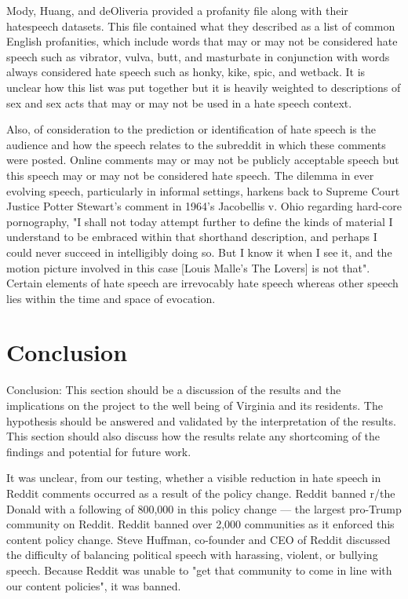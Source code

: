 \documentclass[conference]{IEEEtran}
\begin{document}
Mody, Huang, and deOliveria\cite{b8} provided a profanity file along with their hatespeech\cite{b8} datasets. This file contained what they described as a list of common English profanities, which include words that may or may not be considered hate speech such as vibrator, vulva, butt, and masturbate in conjunction with words always considered hate speech such as honky, kike, spic, and wetback. It is unclear how this list was put together but it is heavily weighted to descriptions of sex and sex acts that may or may not be used in a hate speech context. 

Also, of consideration to the prediction or identification of hate speech is the audience and how the speech relates to the subreddit in which these comments were posted. Online comments may or may not be publicly acceptable speech but this speech may or may not be considered hate speech. The dilemma in ever evolving speech, particularly in informal settings, harkens back to Supreme Court Justice Potter Stewart's comment in 1964's Jacobellis v. Ohio regarding hard-core pornography, "I shall not today attempt further to define the kinds of material I understand to be embraced within that shorthand description, and perhaps I could never succeed in intelligibly doing so. But I know it when I see it, and the motion picture involved in this case [Louis Malle's The Lovers] is not that"\cite{b24}. Certain elements of hate speech are irrevocably hate speech whereas other speech lies within the time and space of evocation. 

\section{Conclusion}
Conclusion: This section should be a discussion of the results and the implications on the project to the well being of Virginia and its residents. The hypothesis should be answered and validated by the interpretation of the results. This section should also discuss how the results relate any shortcoming of the findings and potential for future work.


It was unclear, from our testing, whether a visible reduction in hate speech in Reddit comments occurred as a result of the policy change. Reddit banned r/the Donald with a following of 800,000 in this policy change --- the largest pro-Trump community on Reddit. Reddit banned over 2,000 communities as it enforced this content policy change. Steve Huffman, co-founder and CEO of Reddit discussed the difficulty of balancing political speech with harassing, violent, or bullying speech. Because Reddit was unable to "get that community to come in line with our content policies"\cite{b25}, it was banned. 
\end{document}
